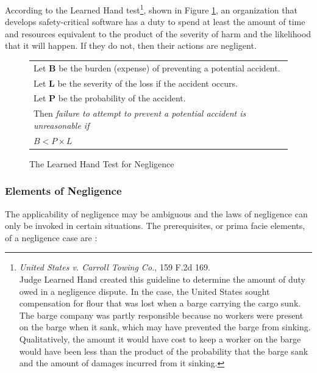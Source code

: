 According to the Learned Hand test\footnote{\textit{United States v. Carroll
Towing Co.}, 159 F.2d 169.\\ Judge Learned Hand created this guideline to
determine the amount of duty owed in a negligence dispute. In the case, the
United States sought compensation for flour that was lost when a barge carrying
the cargo sunk. The barge company was partly responsible because no workers were
present on the barge when it sank, which may have prevented the barge from
sinking. Qualitatively, the amount it would have cost to keep a worker on the
barge would have been less than the product of the probability that the barge
sank and the amount of damages incurred from it sinking.}, shown in Figure
\ref{fig:handtest}, an organization that develops safety-critical software has a
duty to spend at least the amount of time and resources equivalent to the
product of the severity of harm and the likelihood that it will happen. If they
do not, then their actions are negligent.

\begin{figure}
\begin{narrow}{-1.5in}{-1.5in}\begin{center}
\begin{tabular}{|l|}
\hline
	Let \textbf{B} be the burden (expense) of preventing a potential accident.\\
	Let \textbf{L} be the severity of the loss if the accident occurs.\\
	Let \textbf{P} be the probability of the accident.\\[6pt]
	Then \textit{failure to attempt to prevent a potential accident is 
	unreasonable if}\\[8pt]

      \centerline{\(B < P \times L\)}
\\[3pt]
\hline
\end{tabular}
\end{center}\end{narrow}
\caption{The Learned Hand Test for Negligence}
\label{fig:handtest}
\end{figure}

\subsubsection{Elements of Negligence}\label{SS:Elements}
The applicability of negligence may be ambiguous and the laws of negligence can
only be invoked in certain situations. The prerequisites, or prima facie
elements, of a negligence case are \cite{Dobbs01}:

